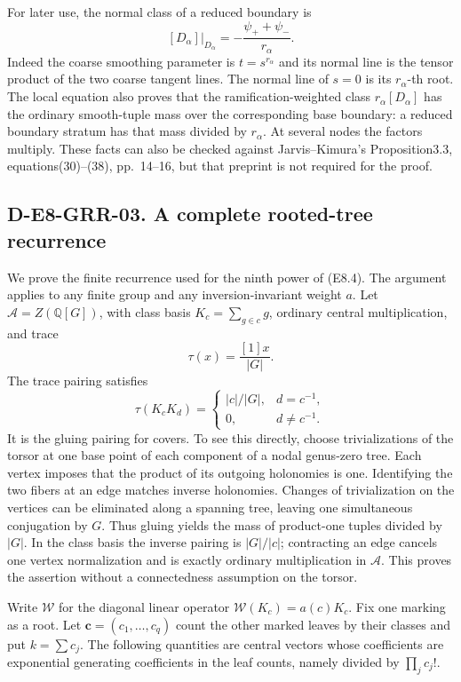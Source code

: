 For later use, the normal class of a reduced boundary is
\[
 [D_\alpha]|_{D_\alpha}
       =-\frac{\psi_++\psi_-}{r_\alpha}.                     \tag{E8.7}
\]
Indeed the coarse smoothing parameter is $t=s^{r_\alpha}$ and its
normal line is the tensor product of the two coarse tangent lines.
The normal line of $s=0$ is its $r_\alpha$-th root.  The local
equation also proves that the ramification-weighted class
$r_\alpha[D_\alpha]$ has the ordinary smooth-tuple mass over the
corresponding base boundary: a reduced boundary stratum has that
mass divided by $r_\alpha$.  At several nodes the factors multiply.
These facts can also be checked against Jarvis--Kimura's
Proposition3.3, equations(30)--(38), pp.~14--16, but that preprint is
not required for the proof.

\subsection*{D-E8-GRR-03. A complete rooted-tree recurrence}

We prove the finite recurrence used for the ninth power of (E8.4).
The argument applies to any finite group and any inversion-invariant
weight $a$.  Let $\mathcal A=Z(\mathbb Q[G])$, with class basis
$K_c=\sum_{g\in c}g$, ordinary central multiplication, and trace
\[
                  \tau(x)=\frac{[1]x}{|G|}.
\]
The trace pairing satisfies
\[
 \tau(K_cK_d)=\begin{cases}|c|/|G|,&d=c^{-1},\\0,&d\ne c^{-1}.
 \end{cases}                                                   \tag{E8.8}
\]
It is the gluing pairing for covers.  To see this directly, choose
trivializations of the torsor at one base point of each component
of a nodal genus-zero tree.  Each vertex imposes that the product
of its outgoing holonomies is one.  Identifying the two fibers at
an edge matches inverse holonomies.  Changes of trivialization
on the vertices can be eliminated along a spanning tree, leaving
one simultaneous conjugation by $G$.  Thus gluing yields the mass
of product-one tuples divided by $|G|$.  In the class basis the
inverse pairing is $|G|/|c|$; contracting an edge cancels one
vertex normalization and is exactly ordinary multiplication in
$\mathcal A$.  This proves the assertion without a connectedness
assumption on the torsor.

Write $\mathcal W$ for the diagonal linear operator
$\mathcal W(K_c)=a(c)K_c$.  Fix one marking as a root.  Let
$\mathbf c=(c_1,\ldots,c_q)$ count the other marked leaves by their
classes and put $k=\sum c_j$.  The following quantities are central
vectors whose coefficients are exponential generating coefficients
in the leaf counts, namely divided by $\prod_jc_j!$.

